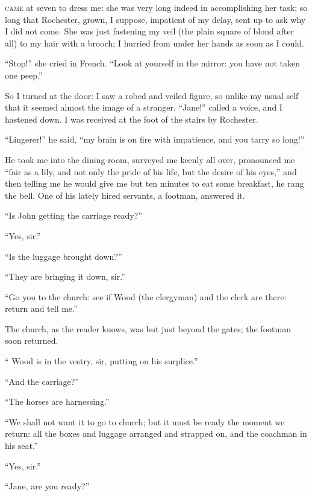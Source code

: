 
 \textsc{came} at seven to dress me: she was very long indeed in
accomplishing her task; so long that \Mr{} Rochester, grown, I suppose,
impatient of my delay, sent up to ask why I did not come. She was just
fastening my veil (the plain square of blond after all) to my hair with
a brooch; I hurried from under her hands as soon as I could.

\enquote{Stop!} she cried in French. \enquote{Look at yourself in the
mirror: you have not taken one peep.}

So I turned at the door: I saw a robed and veiled figure, so unlike my
usual self that it seemed almost the image of a stranger. 
\enquote{Jane!} called a voice, and I hastened down. I was received at
the foot of the stairs by \Mr{} Rochester.

\enquote{Lingerer!} he said, \enquote{my brain is on fire with
impatience, and you tarry so long!}

He took me into the dining-room, surveyed me keenly all over, pronounced
me \enquote{fair as a lily, and not only the pride of his life, but the
desire of his eyes,} and then telling me he would give me but ten
minutes to eat some breakfast, he rang the bell. One of his lately
hired servants, a footman, answered it.

\enquote{Is John getting the carriage ready?}

\enquote{Yes, sir.}

\enquote{Is the luggage brought down?}

\enquote{They are bringing it down, sir.}

\enquote{Go you to the church: see if \Mr{} Wood (the clergyman) and the
clerk are there: return and tell me.}

The church, as the reader knows, was but just beyond the gates; the
footman soon returned.

\enquote{\Mr{} Wood is in the vestry, sir, putting on his surplice.}

\enquote{And the carriage?}

\enquote{The horses are harnessing.}

\enquote{We shall not want it to go to church; but it must be ready the
moment we return: all the boxes and luggage arranged and strapped on,
and the coachman in his seat.}

\enquote{Yes, sir.}

\enquote{Jane, are you ready?}

